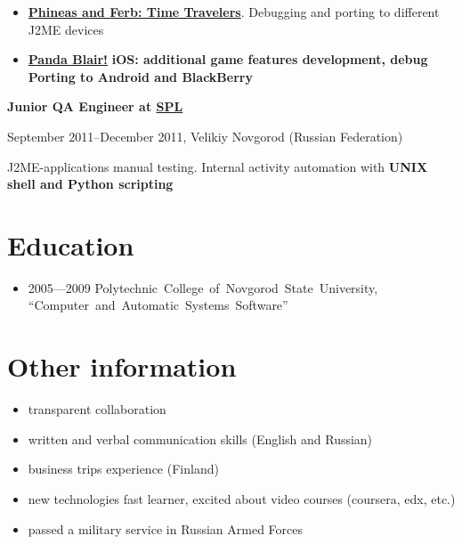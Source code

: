 \begin{itemize}

\setlength{\itemindent}{20pt}
\item
    \href{http://java.mob.org/game/phineas\_and\_ferb\_time\_travelers.html}
        {\bfseries Phineas and Ferb: Time Travelers\mdseries}.
        Debugging and porting to different J2ME devices
\item
    \href{https://itunes.apple.com/us/app/panda-blair!/id500995558?mt=8}
        {\bfseries Panda Blair!\mdseries}
        \bfseries iOS\mdseries: additional game features development, debug
        Porting to \bfseries Android \mdseries and \bfseries BlackBerry\mdseries
\end{itemize}

\vspace{5pt}

{
\fontsize{12pt}{12pt}\selectfont
\bfseries Junior QA Engineer at
\href{http://spl.co}{\bfseries SPL\mdseries}
\mdseries
}

{
\fontsize{9pt}{8pt}\selectfont
September 2011--December 2011, Velikiy Novgorod (Russian Federation)
}

J2ME-applications manual testing. Internal activity automation with
\bfseries UNIX shell \mdseries and \bfseries Python \mdseries scripting

\section{Education}
\begin{itemize}
\item 2005---2009 Polytechnic~College~of~Novgorod~State~University,
``Computer~and~Automatic~Systems~Software''
\end{itemize}

\section{Other information}
\begin{itemize}
\item transparent collaboration
\item written and verbal communication skills (English and Russian)
\item business trips experience (Finland)
\item new technologies fast learner, excited about video courses (coursera, edx, etc.)
\item passed a military service in Russian Armed Forces
\end{itemize}

